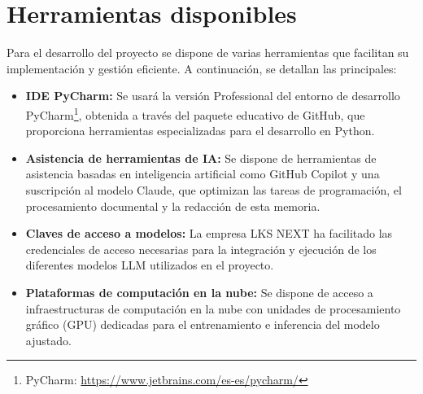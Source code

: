 \section{Herramientas disponibles}
Para el desarrollo del proyecto se dispone de varias herramientas que facilitan su implementación y gestión eficiente. A continuación, se detallan las principales:
\begin{itemize}
\item\textbf{IDE PyCharm: }Se usará la versión Professional del entorno de desarrollo PyCharm\footnote{PyCharm: \url{https://www.jetbrains.com/es-es/pycharm/}}, obtenida a través del paquete educativo de GitHub, que proporciona herramientas especializadas para el desarrollo en Python.
\item\textbf{Asistencia de herramientas de IA: }Se dispone de herramientas de asistencia basadas en inteligencia artificial como GitHub Copilot y una suscripción al modelo Claude, que optimizan las tareas de programación, el procesamiento documental y la redacción de esta memoria.
\item\textbf{Claves de acceso a modelos: }La empresa LKS NEXT ha facilitado las credenciales de acceso necesarias para la integración y ejecución de los diferentes modelos LLM utilizados en el proyecto.
\item\textbf{Plataformas de computación en la nube: }Se dispone de acceso a infraestructuras de computación en la nube con unidades de procesamiento gráfico (GPU) dedicadas para el entrenamiento e inferencia del modelo ajustado.
\end{itemize}












